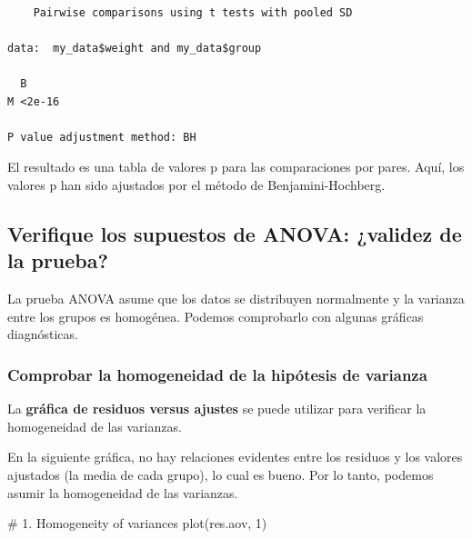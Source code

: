 \documentclass[
  letterpaper,
  DIV=11,
  numbers=noendperiod]{scrartcl}
\newenvironment{Shaded}{\begin{snugshade}}{\end{snugshade}}
\newcommand{\CommentTok}[1]{\textcolor[rgb]{0.37,0.37,0.37}{#1}}
\newcommand{\DecValTok}[1]{\textcolor[rgb]{0.68,0.00,0.00}{#1}}
\newcommand{\FunctionTok}[1]{\textcolor[rgb]{0.28,0.35,0.67}{#1}}
\newcommand{\NormalTok}[1]{\textcolor[rgb]{0.00,0.23,0.31}{#1}}
\begin{document}
\begin{verbatim}

    Pairwise comparisons using t tests with pooled SD 

data:  my_data$weight and my_data$group 

  B     
M <2e-16

P value adjustment method: BH 
\end{verbatim}

El resultado es una tabla de valores p para las comparaciones por pares.
Aquí, los valores p han sido ajustados por el método de
Benjamini-Hochberg.

\hypertarget{verifique-los-supuestos-de-anova-validez-de-la-prueba}{%
\subsection{Verifique los supuestos de ANOVA: ¿validez de la
prueba?}\label{verifique-los-supuestos-de-anova-validez-de-la-prueba}}

La prueba ANOVA asume que los datos se distribuyen normalmente y la
varianza entre los grupos es homogénea. Podemos comprobarlo con algunas
gráficas diagnósticas.

\hypertarget{comprobar-la-homogeneidad-de-la-hipuxf3tesis-de-varianza}{%
\subsubsection{Comprobar la homogeneidad de la hipótesis de
varianza}\label{comprobar-la-homogeneidad-de-la-hipuxf3tesis-de-varianza}}

La \textbf{gráfica de residuos versus ajustes} se puede utilizar para
verificar la homogeneidad de las varianzas.

En la siguiente gráfica, no hay relaciones evidentes entre los residuos
y los valores ajustados (la media de cada grupo), lo cual es bueno. Por
lo tanto, podemos asumir la homogeneidad de las varianzas.

\begin{Shaded}
\begin{Highlighting}[]
\CommentTok{\# 1. Homogeneity of variances}
\FunctionTok{plot}\NormalTok{(res.aov, }\DecValTok{1}\NormalTok{)}
\end{Highlighting}
\end{Shaded}
\end{document}
